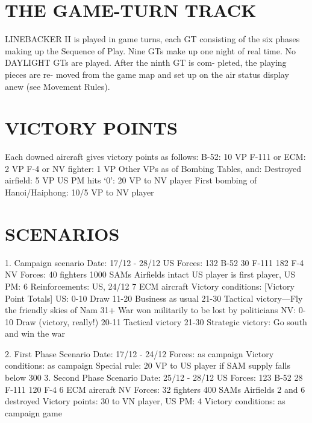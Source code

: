 \section*{THE GAME-TURN TRACK}
LINEBACKER II is played in game
turns, each GT consisting of the six
phases making up the Sequence of
Play. Nine GTs make up one night of
real time. No DAYLIGHT GTs are
played. After the ninth GT is com-
pleted, the playing pieces are re-
moved from the game map and set up
on the air status display anew (see
Movement Rules).
\section*{VICTORY POINTS}
Each downed aircraft gives victory 
points as follows:
B-52: 10 VP
F-111 or ECM: 2 VP
F-4 or NV fighter: 1 VP
Other VPs as of Bombing Tables, 
and:
Destroyed airfield: 5 VP
US PM hits ‘0’: 20 VP to NV player
First bombing of Hanoi/Haiphong:
10/5 VP to NV player

\section*{SCENARIOS}
1. Campaign scenario
Date: 17/12 - 28/12
US Forces:
132 B-52
30 F-111
182 F-4
NV Forces:
40 fighters
1000 SAMs
Airfields intact
US player is first player, US PM: 6
Reinforcements: US, 24/12 7 ECM 
aircraft
Victory conditions:
[Victory Point Totals]
US:
0-10 Draw
11-20 Business as usual
21-30 Tactical victory—Fly the 
friendly skies of Nam
31+ War won militarily to be lost 
by politicians
NV:
0-10 Draw (victory, really!)
20-11 Tactical victory
21-30 Strategic victory: Go south and 
win the war

2. First Phase Scenario
Date: 17/12 - 24/12
Forces: as campaign
Victory conditions: as campaign
Special rule: 20 VP to US player if 
SAM supply falls below 300
3. Second Phase Scenario
Date: 25/12 - 28/12
US Forces:
123 B-52
28 F-111
120 F-4
6 ECM aircraft
NV Forces:
32 fighters
400 SAMs
Airfields 2 and 6 destroyed
Victory points: 30 to VN player,
US PM: 4
Victory conditions: as campaign game

